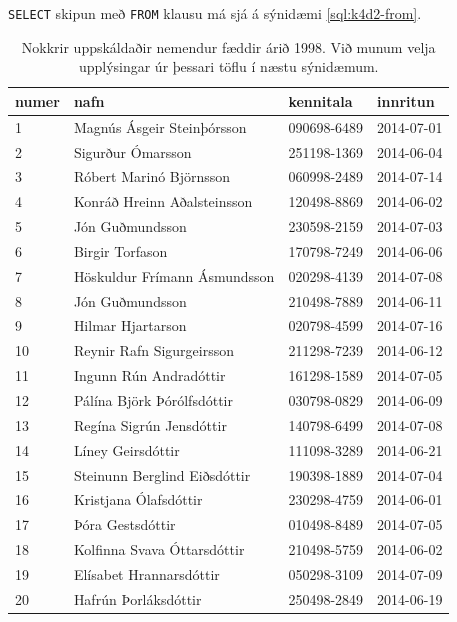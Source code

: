 \verb|SELECT| skipun með \verb|FROM| klausu má sjá á sýnidæmi \ref{sql:k4d2-from}.

\begin{table}
\centering
\caption[Nemendur]{Nokkrir uppskáldaðir nemendur fæddir árið 1998. Við munum velja upplýsingar úr þessari töflu í næstu sýnidæmum.}
\label{tafla:nemendur}
\begin{tabular}{llll}
\toprule
numer&nafn&kennitala&innritun\\
\midrule
1&Magnús Ásgeir Steinþórsson&090698-6489& 2014-07-01\\
2&Sigurður Ómarsson&251198-1369& 2014-06-04\\
3&Róbert Marinó Björnsson&060998-2489& 2014-07-14\\
4&Konráð Hreinn Aðalsteinsson&120498-8869& 2014-06-02\\
5&Jón Guðmundsson&230598-2159& 2014-07-03\\
6&Birgir Torfason&170798-7249& 2014-06-06\\
7&Höskuldur Frímann Ásmundsson&020298-4139& 2014-07-08\\
8&Jón Guðmundsson&210498-7889& 2014-06-11\\
9&Hilmar Hjartarson&020798-4599& 2014-07-16\\
10&Reynir Rafn Sigurgeirsson&211298-7239& 2014-06-12\\
11&Ingunn Rún Andradóttir&161298-1589& 2014-07-05\\
12&Pálína Björk Þórólfsdóttir&030798-0829& 2014-06-09\\
13&Regína Sigrún Jensdóttir&140798-6499& 2014-07-08\\
14&Líney Geirsdóttir&111098-3289& 2014-06-21\\
15&Steinunn Berglind Eiðsdóttir&190398-1889& 2014-07-04\\
16&Kristjana Ólafsdóttir&230298-4759& 2014-06-01\\
17&Þóra Gestsdóttir&010498-8489& 2014-07-05\\
18&Kolfinna Svava Óttarsdóttir&210498-5759& 2014-06-02\\
19&Elísabet Hrannarsdóttir&050298-3109& 2014-07-09\\
20&Hafrún Þorláksdóttir&250498-2849& 2014-06-19\\
\bottomrule
\end{tabular}
\end{table}

\begin{example}
\caption[SELECT FROM]{\emph{SELECT} skipun með \emph{FROM} klausu. Hún velur allan ``nafn'' dálkinn úr töflunni Nemendur (\ref{tafla:nemendur}).}
\label{sql:k4d2-from}
\centering
{}
\end{example}

